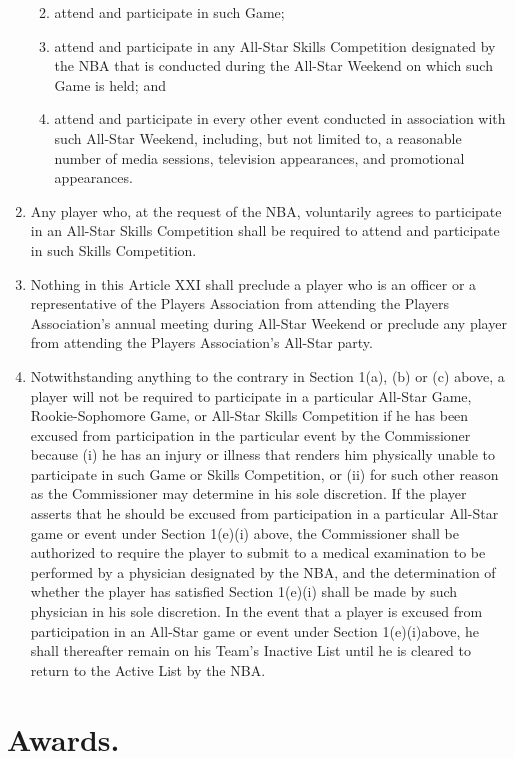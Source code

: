 \documentclass[
]{book}
\providecommand{\tightlist}{%
  \setlength{\itemsep}{0pt}\setlength{\parskip}{0pt}}
\begin{document}
\begin{enumerate}
  \begin{enumerate}
  \def\labelenumii{(\roman{enumii})}
  \tightlist
  \item
    attend and participate in such Game;
  \item
    attend and participate in any All-Star Skills Competition designated by the NBA that is conducted during the All-Star Weekend on which such Game is held; and
  \item
    attend and participate in every other event conducted in association with such All-Star Weekend, including, but not limited to, a reasonable number of media sessions, television appearances, and promotional appearances.
  \end{enumerate}
\item
  Any player who, at the request of the NBA, voluntarily agrees to participate in an All-Star Skills Competition shall be required to attend and participate in such Skills Competition.
\item
  Nothing in this Article XXI shall preclude a player who is an officer or a representative of the Players Association from attending the Players Association's annual meeting during All-Star Weekend or preclude any player from attending the Players Association's All-Star party.
\item
  Notwithstanding anything to the contrary in Section 1(a), (b) or (c) above, a player will not be required to participate in a particular All-Star Game, Rookie-Sophomore Game, or All-Star Skills Competition if he has been excused from participation in the particular event by the Commissioner because (i) he has an injury or illness that renders him physically unable to participate in such Game or Skills Competition, or (ii) for such other reason as the Commissioner may determine in his sole discretion. If the player asserts that he should be excused from participation in a particular All-Star game or event under Section 1(e)(i) above, the Commissioner shall be authorized to require the player to submit to a medical examination to be performed by a physician designated by the NBA, and the determination of whether the player has satisfied Section 1(e)(i) shall be made by such physician in his sole discretion. In the event that a player is excused from participation in an All-Star game or event under Section 1(e)(i)above, he shall thereafter remain on his Team's Inactive List until he is cleared to return to the Active List by the NBA.
\end{enumerate}

\hypertarget{awards.}{%
\section{Awards.}\label{awards.}}
\end{document}
